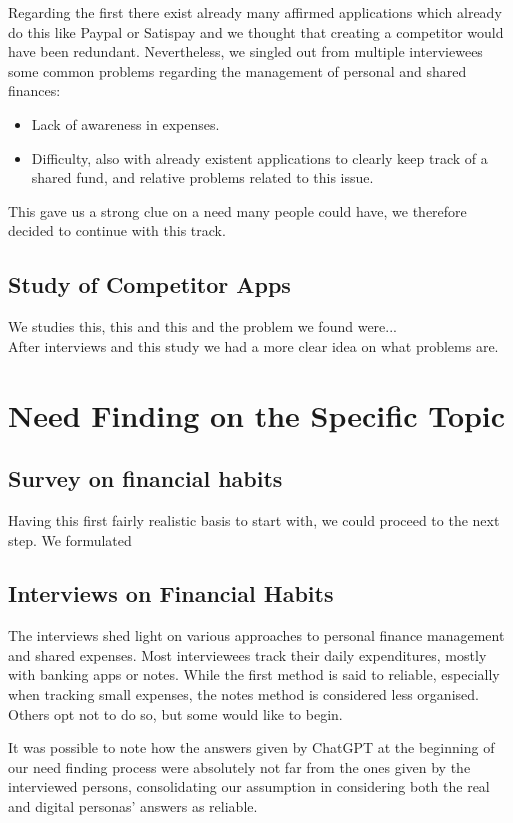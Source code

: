 Regarding the first there exist already many affirmed applications which already do this like Paypal or Satispay and we thought that creating a competitor would have been redundant.
Nevertheless, we singled out from multiple interviewees some common problems regarding the management of personal and shared finances:
\begin{itemize}
    \item Lack of awareness in expenses.
    \item Difficulty, also with already existent applications to clearly keep track of a shared fund, and relative problems related to this issue.
\end{itemize}
This gave us a strong clue on a need many people could have, we therefore decided to continue with this track.
\subsection{Study of Competitor Apps}
We studies this, this and this and the problem we found were...\\
After interviews and this study we had a more clear idea on what problems are.
\section{Need Finding on the Specific Topic}
\subsection{Survey on financial habits}
Having this first fairly realistic basis to start with, we could proceed to the next step.
We formulated 
\subsection{Interviews on Financial Habits}
The interviews shed light on various approaches to personal finance management and shared expenses. Most interviewees track their daily expenditures, mostly with banking apps or notes. While the first method is said to reliable, especially when tracking small expenses, the notes method is considered less organised. Others opt not to do so, but some would like to begin.

It was possible to note how the answers given by ChatGPT at the beginning of our need finding process were absolutely not far from the ones given by the interviewed persons, consolidating our assumption in considering both the real and digital personas' answers as reliable.

